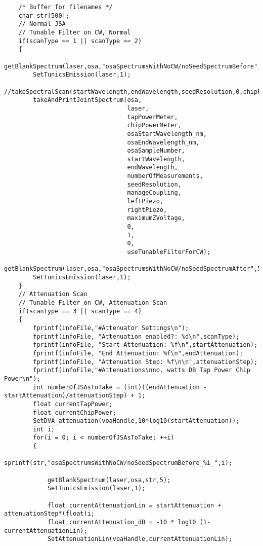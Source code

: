 \begin{lstlisting}
    /* Buffer for filenames */
    char str[500];
    // Normal JSA
    // Tunable Filter on CW, Normal
    if(scanType == 1 || scanType == 2)
    {
        getBlankSpectrum(laser,osa,"osaSpectrumsWithNoCW/noSeedSpectrumBefore",5);
        SetTunicsEmission(laser,1);
        //takeSpectralScan(startWavelength,endWavelength,seedResolution,0,chipPowerMeter,tapPowerMeter,laser);
        takeAndPrintJointSpectrum(osa,
                                  laser,
                                  tapPowerMeter,
                                  chipPowerMeter,
                                  osaStartWavelength_nm,
                                  osaEndWavelength_nm,
                                  osaSampleNumber,
                                  startWavelength,
                                  endWavelength,
                                  numberOfMeasurements,
                                  seedResolution,
                                  manageCoupling,
                                  leftPiezo,
                                  rightPiezo,
                                  maximumZVoltage,
                                  0,
                                  1,
                                  0,
                                  useTunableFilterForCW);
        getBlankSpectrum(laser,osa,"osaSpectrumsWithNoCW/noSeedSpectrumAfter",5);
        SetTunicsEmission(laser,1);
    }
    // Attenuation Scan
    // Tunable Filter on CW, Attenuation Scan
    if(scanType == 3 || scanType == 4)
    {
        fprintf(infoFile,"#Attenuator Settings\n");
        fprintf(infoFile, "Attenuation enabled?: %d\n",scanType);
        fprintf(infoFile, "Start Attenuation: %f\n",startAttenuation);
        fprintf(infoFile, "End Attenuation: %f\n",endAttenuation);
        fprintf(infoFile, "Attenuation Step: %f\n\n",attenuationStep);
        fprintf(infoFile,"#Attenuations\nno. watts DB Tap Power Chip Power\n");
        int numberOfJSAsToTake = (int)((endAttenuation - startAttenuation)/attenuationStep) + 1;
        float currentTapPower;
        float currentChipPower;
        SetDVA_attenuation(voaHandle,10*log10(startAttenuation));
        int i;
        for(i = 0; i < numberOfJSAsToTake; ++i)
        {
            sprintf(str,"osaSpectrumsWithNoCW/noSeedSpectrumBefore_%i_",i);

            getBlankSpectrum(laser,osa,str,5);
            SetTunicsEmission(laser,1);

            float currentAttenuationLin = startAttenuation + attenuationStep*(float)i;
            float currentAttenuation_dB = -10 * log10 (1-currentAttenuationLin);
            SetAttenuationLin(voaHandle,currentAttenuationLin);


\end{lstlisting}
